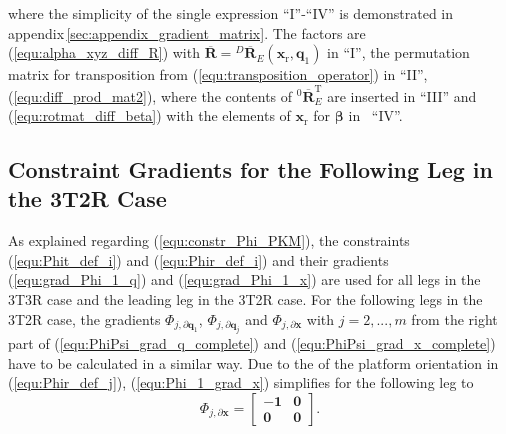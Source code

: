 \documentclass[robotics,article,accept,moreauthors,pdftex]{Definitions/mdpi}
\newcommand{\bm}[1]{\boldsymbol{#1}}
\newcommand{\rotmato}[2]{{{ }^{#1}\boldsymbol{\overline{R}}}_{#2}}
\newcommand{\transp}[0]{{\mathrm{T}}}
\let\Phi\varPhi
\begin{document}
%
where the simplicity of the single expression ``I''-``IV'' is demonstrated in appendix\,\ref{sec:appendix_gradient_matrix}.
The factors are~
(\ref{equ:alpha_xyz_diff_R}) with $\overline{\bm{R}}=\rotmato{D}{E}(\bm{x}_{\mathrm{r}},\bm{q}_1)$ in ``I'',
the permutation matrix for transposition from (\ref{equ:transposition_operator}) in ``II'',~
(\ref{equ:diff_prod_mat2}), where the contents of $\rotmato{0}{E}^\transp$ are inserted in ``III'' and
(\ref{equ:rotmat_diff_beta}) with the elements of $\bm{x}_{\mathrm{r}}$ for $\bm{\beta}$ in~ ``IV''.

\subsection{Constraint Gradients for the Following Leg in the 3T2R Case}

As explained regarding (\ref{equ:constr_Phi_PKM}), the constraints (\ref{equ:Phit_def_i}) and (\ref{equ:Phir_def_i}) and their gradients (\ref{equ:grad_Phi_1_q}) and (\ref{equ:grad_Phi_1_x}) are used for all legs in the 3T3R case and the leading leg in the 3T2R case.
For the following legs in the 3T2R case, the gradients $\bm{\Phi}_{j,\partial\bm{q}_1}$, $\bm{\Phi}_{j,\partial\bm{q}_j}$ and $\bm{\Phi}_{j,\partial\bm{x}}$ with $j=2,...,m$ from the right part of (\ref{equ:PhiPsi_grad_q_complete}) and (\ref{equ:PhiPsi_grad_x_complete}) have to be calculated in a similar way. 
Due to the  of the platform orientation in (\ref{equ:Phir_def_j}), (\ref{equ:Phi_1_grad_x}) simplifies for the following leg to 
%
\vspace{-0.3cm} %
\begin{equation}
\bm{\Phi}_{j,\partial\bm{x}}
=
\begin{bmatrix}
-\bm{1} & \bm{0} \\
\bm{0} & \bm{0}
\end{bmatrix}.
\end{equation}
%
\end{document}
